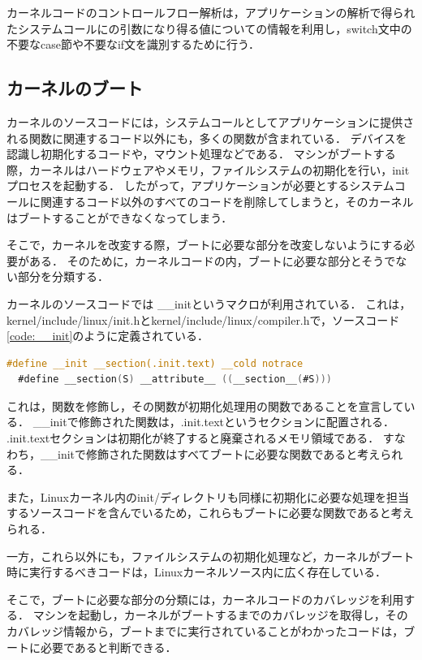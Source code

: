 \documentclass[graduation-thesis]{mlarticle}
\begin{document}
カーネルコードのコントロールフロー解析は，アプリケーションの解析で得られたシステムコールにの引数になり得る値についての情報を利用し，switch文中の不要なcase節や不要なif文を識別するために行う．

\subsection{カーネルのブート}
\label{propo:boot}
カーネルのソースコードには，システムコールとしてアプリケーションに提供される関数に関連するコード以外にも，多くの関数が含まれている．
デバイスを認識し初期化するコードや，マウント処理などである．
マシンがブートする際，カーネルはハードウェアやメモリ，ファイルシステムの初期化を行い，initプロセスを起動する．
したがって，アプリケーションが必要とするシステムコールに関連するコード以外のすべてのコードを削除してしまうと，そのカーネルはブートすることができなくなってしまう．

そこで，カーネルを改変する際，ブートに必要な部分を改変しないようにする必要がある．
そのために，カーネルコードの内，ブートに必要な部分とそうでない部分を分類する．

カーネルのソースコードでは \_\_initというマクロが利用されている．
これは，kernel/include/linux/init.hとkernel/include/linux/compiler.hで，ソースコード\ref{code:__init}のように定義されている．

\begin{lstlisting}[language=C, caption=\_\_initマクロの定義, label=code:__init]
  #define __init __section(.init.text) __cold notrace
  #define __section(S) __attribute__ ((__section__(#S)))
\end{lstlisting}

これは，関数を修飾し，その関数が初期化処理用の関数であることを宣言している．
\_\_initで修飾された関数は，.init.textというセクションに配置される．
.init.textセクションは初期化が終了すると廃棄されるメモリ領域である．
すなわち，\_\_initで修飾された関数はすべてブートに必要な関数であると考えられる．

また，Linuxカーネル内のinit/ディレクトリも同様に初期化に必要な処理を担当するソースコードを含んでいるため，これらもブートに必要な関数であると考えられる．

一方，これら以外にも，ファイルシステムの初期化処理など，カーネルがブート時に実行するべきコードは，Linuxカーネルソース内に広く存在している．

そこで，ブートに必要な部分の分類には，カーネルコードのカバレッジを利用する．
マシンを起動し，カーネルがブートするまでのカバレッジを取得し，そのカバレッジ情報から，ブートまでに実行されていることがわかったコードは，ブートに必要であると判断できる．
\end{document}
